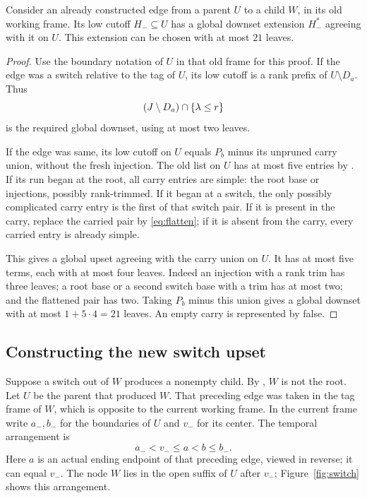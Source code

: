 \begin{lemma}\label{lem:old-low}
Consider an already constructed edge from a parent \(U\) to a child
\(W\), in its old working frame. Its low cutoff \(H_-\subseteq U\)
has a global downset extension \(H_-^*\) agreeing with it on \(U\).
This extension can be chosen with at most \(21\) leaves.
\end{lemma}
\begin{proof}
Use the boundary notation of \(U\) in that old frame for this proof.
If the edge was a switch relative to the tag of \(U\), its low
cutoff is a rank prefix of \(U\setminus D_a\). Thus
\[
 (J\setminus D_a)\cap\{\lambda\le r\}
\]
is the required global downset, using at most two leaves.

If the edge was same, its low cutoff on \(U\) equals \(P_b\)
minus its unpruned carry union, without the fresh injection.
The old list on \(U\) has at most five entries by
. If its run began at the root, all carry
entries are simple: the root base or injections, possibly rank-trimmed.
If it began at a switch, the only possibly complicated carry
entry is the first of that switch pair. If it is present in the carry,
replace the carried pair by \eqref{eq:flatten}; if it is absent from
the carry, every carried entry is already simple.

This gives a global upset agreeing with the carry union on \(U\).
It has at most five terms, each with at most four leaves.
Indeed an injection with a rank trim has three leaves; a root
base or a second switch base with a trim has at most two; and
the flattened pair has two. Taking \(P_b\) minus this union
gives a global downset with at most \(1+5\cdot4=21\) leaves.
An empty carry is represented by false.
\end{proof}

\subsection{Constructing the new switch upset}

Suppose a switch out of \(W\) produces a nonempty child.
By , \(W\) is not the root.
Let \(U\) be the parent that produced \(W\).
That preceding edge was taken in the tag frame of \(W\), which
is opposite to the current working frame.
In the current frame write \(a_-,b_-\) for the boundaries of \(U\)
and \(v_-\) for its center. The temporal arrangement is
\begin{equation}
 a_-<v_-\le a<b\le b_-.
 \label{eq:ancestry}
\end{equation}
Here \(a\) is an actual ending endpoint of that preceding edge,
viewed in reverse; it can equal \(v_-\).
The node \(W\) lies in the open suffix of \(U\) after \(v_-\);
Figure~\ref{fig:switch} shows this arrangement.

